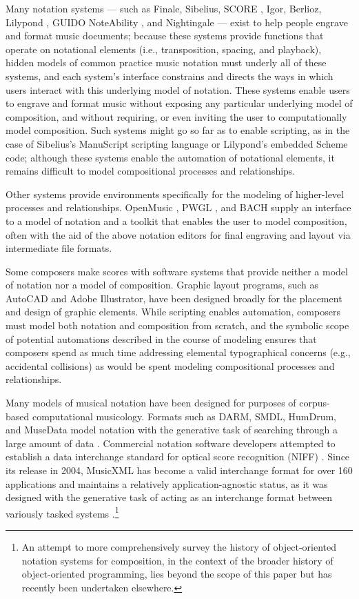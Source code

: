 \documentclass{article}
\begin{document}
Many notation systems --- such as Finale, Sibelius, SCORE \cite{Smith:1972mw},
Igor, Berlioz, Lilypond \cite{Nienhuys:2003ve}, GUIDO \cite{Hoos:1998bd}
NoteAbility \cite{hamel1noteability}, and Nightingale --- exist to help people
engrave and format music documents; because these systems provide functions
that operate on notational elements (i.e., transposition, spacing, and
playback), hidden models of common practice music notation must underly all of
these systems, and each system's interface constrains and directs the ways in
which users interact with this underlying model of notation. These systems
enable users to engrave and format music without exposing any particular
underlying model of composition, and without requiring, or even inviting the
user to computationally model composition. Such systems might go so far as to
enable scripting, as in the case of Sibelius's ManuScript \cite{Technology:qc}
scripting language or Lilypond's embedded Scheme code; although these systems
enable the automation of notational elements, it remains difficult to model
compositional processes and relationships.

Other systems provide environments specifically for the modeling of
higher-level processes and relationships. OpenMusic \cite{Assayag:1999sw}, PWGL
\cite{Laurson:2009qf}, and BACH \cite{agostini2013real} supply an interface to
a model of notation and a toolkit that enables the user to model composition,
often with the aid of the above notation editors for final engraving and layout
via intermediate file formats.

Some composers make scores with software systems that provide neither a model
of notation nor a model of composition. Graphic layout programs, such as
AutoCAD and Adobe Illustrator, have been designed broadly for the placement and
design of graphic elements. While scripting enables automation, composers must
model both notation and composition from scratch, and the symbolic scope of
potential automations described in the course of modeling ensures that
composers spend as much time addressing elemental typographical concerns (e.g.,
accidental collisions) as would be spent modeling compositional processes and
relationships.

Many models of musical notation have been designed for purposes of
corpus-based computational musicology. Formats such as DARM, SMDL,
HumDrum, and MuseData model notation with the generative task of searching
through a large amount of data \cite{Selfridge-Field:1997ud}. Commercial
notation software developers attempted to establish a data interchange standard
for optical score recognition (NIFF) \cite{niff1995niff}. Since its release in
2004, MusicXML has become a valid interchange format for over 160 applications
and maintains a relatively application-agnostic status, as it was designed with
the generative task of acting as an interchange format between variously tasked
systems \cite{Good:2001if}.\footnote{An attempt to more
comprehensively survey the history of object-oriented notation systems for
composition, in the context of the broader history of object-oriented
programming, lies beyond the scope of this paper but has recently been
undertaken elsewhere\cite{trevino2013compositional}.}
\end{document}
